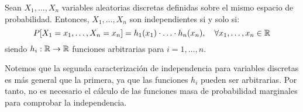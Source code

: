 \begin{prop}
    Sean $X_1, \ldots, X_n$ variables aleatorias discretas definidas sobre el mismo espacio de probabilidad. Entonces, $X_1, \ldots, X_n$ son independientes si y solo si:
    \[
        P[X_1 = x_1, \ldots, X_n = x_n] = h_1(x_1) \cdot \ldots \cdot h_n(x_n), \quad \forall x_1, \ldots, x_n \in \mathbb{R}
    \]
    siendo $h_i: \mathbb{R} \to \mathbb{R}$ funciones arbitrarias para $i = 1, \ldots, n$.
\end{prop}
\begin{observacion}
    Notemos que la segunda caracterización de independencia para variables discretas es más general que la primera, ya que las funciones $h_i$ pueden ser arbitrarias. Por tanto, no es necesario el cálculo de las funciones masa de probabilidad marginales para comprobar la independencia.
\end{observacion}

